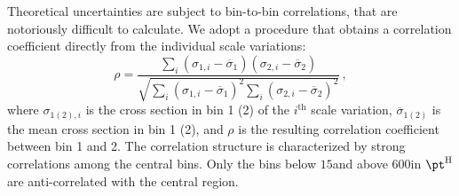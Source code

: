 Theoretical uncertainties are subject to bin-to-bin correlations, that are notoriously difficult to calculate.
% 
We adopt a procedure that obtains a correlation coefficient directly from the individual scale variations:
% 
\begin{equation}
\rho = 
\frac{
    \sum_i ( \sigma_{1, i} - \overline{\sigma}_1 ) ( \sigma_{2, i} - \overline{\sigma}_2 )
    }{
    \sqrt{
        \sum_i ( \sigma_{1, i} - \overline{\sigma}_1 )^2
        \sum_i ( \sigma_{2, i} - \overline{\sigma}_2 )^2
        }
    }
    \,,
\end{equation}
% 
where $\sigma_{1 (2), i}$ is the cross section in bin 1 (2) of the $i^\text{th}$ scale variation, $\overline{\sigma}_{1 (2)}$ is the mean cross section in bin 1 (2), and $\rho$ is the resulting correlation coefficient between bin 1 and 2.
% 
% 
% 
The correlation structure is characterized by strong correlations among the central bins.
% 
Only the bins below $15$\GeV and above $600$\GeV in $\pth$ are anti-correlated with the central region.




